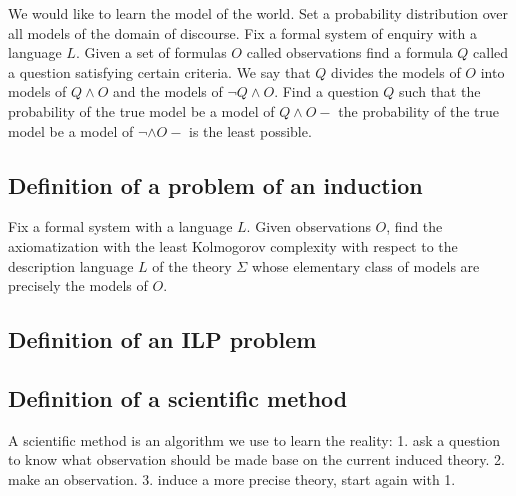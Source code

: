 We would like to learn the model of the world. Set a probability distribution over all models of the domain of discourse. Fix a formal system of enquiry with a language $L$. Given a set of formulas $O$ called observations find a formula $Q$ called a question satisfying certain criteria.
We say that $Q$ divides the models of $O$ into models of $Q \wedge O$ and the models of $\neg Q \wedge O$. Find a question $Q$ such that the probability of the true model be a model of $Q \wedge O \minus$ the probability of the true model be a model of $\neg \wedge O \minus$ is the least possible.

\subsection{Definition of a problem of an induction}
Fix a formal system with a language $L$. Given observations $O$, find the axiomatization with the least Kolmogorov complexity with respect to the description language $L$ of the theory $\Sigma$ whose elementary class of models are precisely the models of $O$.

\subsection{Definition of an ILP problem}

\subsection{Definition of a scientific method}
A scientific method is an algorithm we use to learn the reality:
1. ask a question to know what observation should be made base on the current induced theory.
2. make an observation.
3. induce a more precise theory, start again with 1.